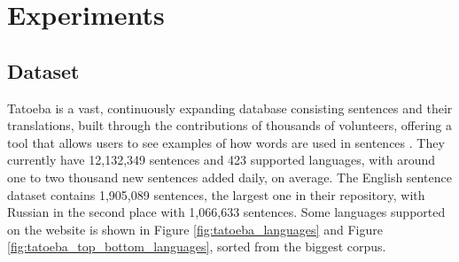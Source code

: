 \documentclass[a4paper]{article}
\begin{document}









\section{Experiments}

\subsection{Dataset}

Tatoeba is a vast, continuously expanding database consisting sentences and their translations, built through the contributions of thousands of volunteers, offering a tool that allows users to see examples of how words are used in sentences \cite{tatoeba}. They currently have 12,132,349 sentences and 423 supported languages, with around one to two thousand new sentences added daily, on average. The English sentence dataset contains 1,905,089 sentences, the largest one in their repository, with Russian in the second place with 1,066,633 sentences. Some languages supported on the website is shown in Figure \ref{fig:tatoeba_languages} and Figure \ref{fig:tatoeba_top_bottom_languages}, sorted from the biggest corpus.
\end{document}
